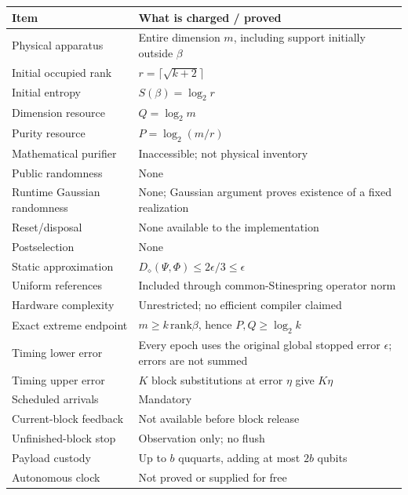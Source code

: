 \documentclass[11pt,a4paper]{article}
\numberwithin{equation}{section}
\begin{document}
\begin{longtable}[]{@{}
  >{\raggedright\arraybackslash}p{}
  >{\raggedright\arraybackslash}p{}@{}}
\toprule\noalign{}
\begin{minipage}[b]{\linewidth}\raggedright
Item
\end{minipage} & \begin{minipage}[b]{\linewidth}\raggedright
What is charged / proved
\end{minipage} \\
\midrule\noalign{}
\endhead
\bottomrule\noalign{}
\endlastfoot
Physical apparatus & Entire dimension \(m\), including support initially
outside \(\beta\) \\
Initial occupied rank & \(r=\lceil\sqrt{k+2}\rceil\) \\
Initial entropy & \(S(\beta)=\log_2r\) \\
Dimension resource & \(Q=\log_2m\) \\
Purity resource & \(P=\log_2(m/r)\) \\
Mathematical purifier & Inaccessible; not physical inventory \\
Public randomness & None \\
Runtime Gaussian randomness & None; Gaussian argument proves existence
of a fixed realization \\
Reset/disposal & None available to the implementation \\
Postselection & None \\
Static approximation &
\(D_\diamond(\Psi,\Phi)\le2\epsilon/3\le\epsilon\) \\
Uniform references & Included through common-Stinespring operator
norm \\
Hardware complexity & Unrestricted; no efficient compiler claimed \\
Exact extreme endpoint & \(m\ge k\,\mathrm{rank}\beta\), hence
\(P,Q\ge\log_2k\) \\
Timing lower error & Every epoch uses the original global stopped error
\(\epsilon\); errors are not summed \\
Timing upper error & \(K\) block substitutions at error \(\eta\) give
\(K\eta\) \\
Scheduled arrivals & Mandatory \\
Current-block feedback & Not available before block release \\
Unfinished-block stop & Observation only; no flush \\
Payload custody & Up to \(b\) ququarts, adding at most \(2b\) qubits \\
Autonomous clock & Not proved or supplied for free \\
\end{longtable}
\end{document}
